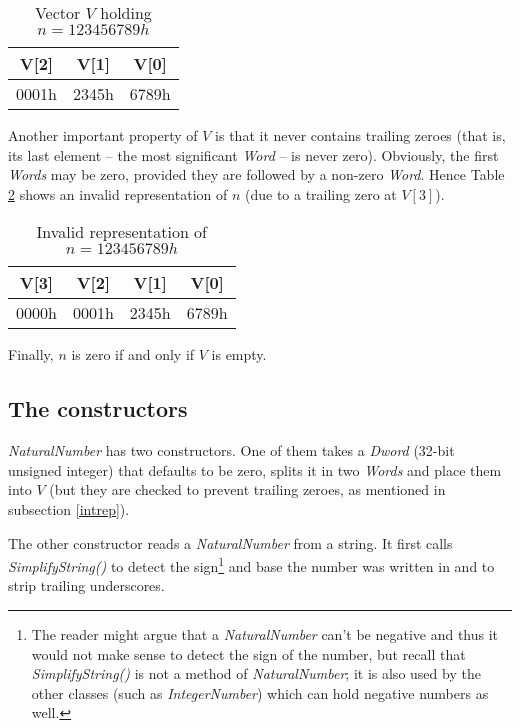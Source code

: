 \documentclass[a4paper,draft,12pt]{book}
\begin{document}
\begin{table}[h]
\begin{center}
\begin{tabular}[h]{|c|c|c|}
V[2]  & V[1]  & V[0]\\
\hline
0001h & 2345h & 6789h\\
\hline
\end{tabular}
\label{tabexv}
\caption{Vector $V$ holding $n = 123456789h$}
\end{center}
\end{table}
Another important property of $V$ is that it never contains trailing
zeroes (that is, its last element -- the most significant \emph{Word}
-- is never zero). Obviously, the first \emph{Words} may be zero,
provided they are followed by a non-zero \emph{Word}. Hence Table \ref{tabwrong}
shows an invalid representation of $n$ (due to a trailing zero at
$V[3]$).

\begin{table}[h]
\begin{center}
\begin{tabular}[h]{|c|c|c|c|}
V[3]  & V[2]  & V[1]  & V[0]\\
\hline
0000h & 0001h & 2345h & 6789h\\
\hline
\end{tabular}
\label{tabwrong}
\caption{Invalid representation of $n = 123456789h$}
\end{center}
\end{table}

Finally, $n$ is zero if and only if $V$ is empty.

\subsection{The constructors}
\emph{NaturalNumber} has two constructors. One of them takes a
\emph{Dword} (32-bit unsigned integer) that defaults to be zero,
splits it in two \emph{Words} and place them into $V$ (but they
are checked to prevent trailing zeroes, as mentioned in subsection
\ref{intrep}).

The other constructor reads a \emph{NaturalNumber} from a string. It
first calls \emph{SimplifyString()} to detect the sign\footnote{
The reader might argue that a \emph{NaturalNumber} can't be
negative and thus it would not make sense to detect the sign of the
number, but recall that \emph{SimplifyString()} is not a method of
\emph{NaturalNumber}; it is also used by the other classes (such as
\emph{IntegerNumber}) which can hold negative numbers as well.} and
base the number was written in and to strip trailing underscores.
\end{document}
